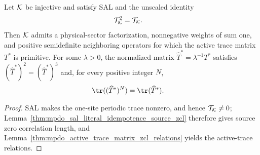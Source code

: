 \begin{lemma}%
    \label{thm:mpdo_active_trace_matrix_literal_zcl_relations}
    \leanok
    Let ${\cal K}$ be injective and satisfy SAL and the unscaled identity
    \begin{align}
        \mathcal T_{\cal K}^2 & =\mathcal T_{\cal K}. \notag
    \end{align}
    Then ${\cal K}$ admits a physical-sector factorization, nonnegative
    weights of sum one, and positive semidefinite neighboring operators for
    which the active trace matrix $T^*$ is primitive. For some
    $\lambda>0$, the normalized matrix
    $\widehat T^*=\lambda^{-1}T^*$ satisfies
    $(\widehat T^*)^2=(\widehat T^*)^3$ and, for every positive integer $N$,
    \begin{align}
        \tr((\widehat T^*)^N) & =\tr(\widehat T^*). \notag
    \end{align}
\end{lemma}

\begin{proof}\leanok
    SAL makes the one-site periodic trace nonzero, and hence
    $\mathcal T_{\cal K}\ne0$;
    Lemma~\ref{thm:mpdo_sal_literal_idempotence_source_zcl} therefore gives
    source zero correlation length, and
    Lemma~\ref{thm:mpdo_active_trace_matrix_zcl_relations} yields the
    active-trace relations.
\end{proof}

